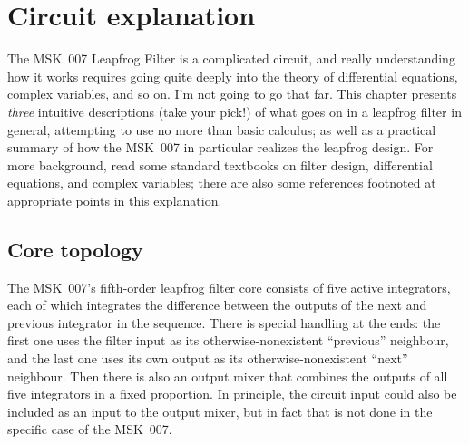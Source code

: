 
%
%
%
%
%
%

\chapter{Circuit explanation}

The MSK~007 Leapfrog Filter is a complicated circuit, and really
understanding how it works requires going quite deeply into the theory of
differential equations, complex variables, and so on.  I'm not going to go
that far.  This chapter presents \emph{three} intuitive descriptions (take
your pick!) of what goes on in a leapfrog filter in general, attempting to
use no more than basic calculus; as well as a practical summary of how the
MSK~007 in particular realizes the leapfrog design.  For more background,
read some standard textbooks on filter design, differential
equations, and complex variables; there are also some references footnoted
at appropriate points in this explanation.


\section{Core topology}

The MSK~007's fifth-order leapfrog filter core consists of five active
integrators, each of which integrates the difference between the outputs of
the next and previous integrator in the sequence.  There is special handling
at the ends: the first one uses the filter input as its
otherwise-nonexistent ``previous'' neighbour, and the last one uses its own
output as its otherwise-nonexistent ``next'' neighbour.  Then there is also
an output mixer that combines the outputs of all five integrators in a fixed
proportion.  In principle, the circuit input could also be included as an
input to the output mixer, but in fact that is not done in the specific case
of the MSK~007.

